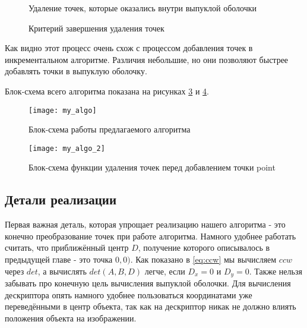 \begin{figure}[H]
	{\centering
		\hfill
		\subbottom[\label{img:my_points_deletion_1_1}]{%
			}
		\hfill
		\subbottom[\label{img:my_points_deletion_1_2}]{%
			}
		\hfill
	}
	\caption{Удаление точек, которые оказались внутри выпуклой оболочки}
	\label{img:my_points_deletion_1}
\end{figure}

\begin{figure}[H]
	{\centering
		\hfill
		\subbottom[\label{img:my_points_deletion_2_1}]{%
			}
		\hfill
		\subbottom[\label{img:my_points_deletion_2_2}]{%
			}
		\hfill
	}
	\caption{Критерий завершения удаления точек}
	\label{img:my_points_deletion_2}
\end{figure}

Как видно этот процесс очень схож с процессом добавления точек в инкрементальном алгоритме. Различия небольшие, но они позволяют быстрее добавлять точки в выпуклую оболочку.

Блок-схема всего алгоритма показана на рисунках \ref{img:my_algo} и \ref{img:my_algo_deletion}.

\begin{figure}[H]
	\centering
	\texttt{[image: my\_algo]}
	\caption{Блок-схема работы предлагаемого алгоритма}
	\label{img:my_algo}
\end{figure}

\begin{figure}[H]
	\centering
	\texttt{[image: my\_algo\_2]}
	\caption{Блок-схема функции удаления точек перед добавлением точки point}
	\label{img:my_algo_deletion}
\end{figure}

\subsection{Детали реализации} \label{subsect2_2_2}

Первая важная деталь, которая упрощает реализацию нашего алгоритма - это конечно преобразование точек при работе алгоритма. Намного удобнее работать считать, что приближённый центр $D$, получение которого описывалось в предыдущей главе - это точка $0, 0)$. Как показано в \ref{eq:ccw} мы вычисляем $ccw$ через $det$, а вычислять $det(A, B, D)$ легче, если $D_x = 0$ и $D_y = 0$. Также нельзя забывать про конечную цель вычисления выпуклой оболочки. Для вычисления дескриптора опять намного удобнее пользоваться координатами уже переведёнными в центр объекта, так как на дескриптор никак не должно влиять положения объекта на изображении.


